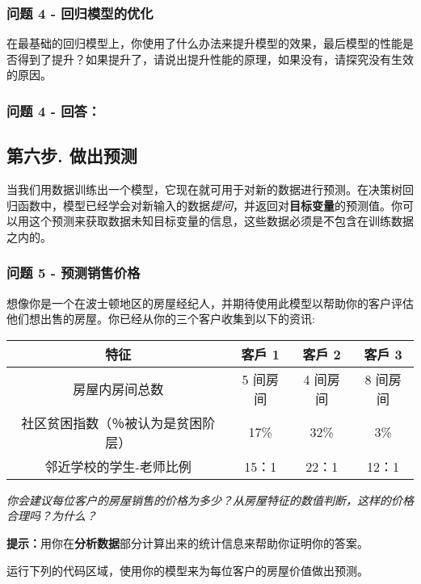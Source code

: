 \documentclass[11pt]{article}
\begin{document}
    \subsubsection{问题 4 -
回归模型的优化}\label{ux95eeux9898-4---ux56deux5f52ux6a21ux578bux7684ux4f18ux5316}

在最基础的回归模型上，你使用了什么办法来提升模型的效果，最后模型的性能是否得到了提升？如果提升了，请说出提升性能的原理，如果没有，请探究没有生效的原因。

    \subsubsection{问题 4 - 回答：}\label{ux95eeux9898-4---ux56deux7b54}

    \subsection{第六步.
做出预测}\label{ux7b2cux516dux6b65.-ux505aux51faux9884ux6d4b}

当我们用数据训练出一个模型，它现在就可用于对新的数据进行预测。在决策树回归函数中，模型已经学会对新输入的数据\emph{提问}，并返回对\textbf{目标变量}的预测值。你可以用这个预测来获取数据未知目标变量的信息，这些数据必须是不包含在训练数据之内的。

    \subsubsection{问题 5 -
预测销售价格}\label{ux95eeux9898-5---ux9884ux6d4bux9500ux552eux4ef7ux683c}

想像你是一个在波士顿地区的房屋经纪人，并期待使用此模型以帮助你的客户评估他们想出售的房屋。你已经从你的三个客户收集到以下的资讯:

\begin{longtable}[]{@{}cccc@{}}
\toprule
特征 & 客戶 1 & 客戶 2 & 客戶 3\tabularnewline
\midrule
\endhead
房屋内房间总数 & 5 间房间 & 4 间房间 & 8 间房间\tabularnewline
社区贫困指数（％被认为是贫困阶层） & 17\% & 32\% & 3\%\tabularnewline
邻近学校的学生-老师比例 & 15：1 & 22：1 & 12：1\tabularnewline
\bottomrule
\end{longtable}

\emph{你会建议每位客户的房屋销售的价格为多少？从房屋特征的数值判断，这样的价格合理吗？为什么？}

\textbf{提示：}用你在\textbf{分析数据}部分计算出来的统计信息来帮助你证明你的答案。

运行下列的代码区域，使用你的模型来为每位客户的房屋价值做出预测。
\end{document}
